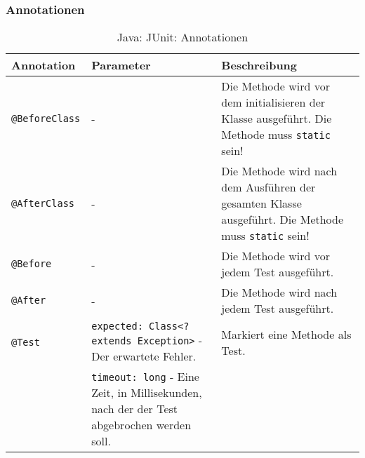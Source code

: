 		\subsubsection{Annotationen}
			\begin{sidewaystable}
				\centering
				\begin{tabular}{l | p{9cm} | p{10cm}}
					Annotation            & Parameter                                                                                        & Beschreibung                                                                                               \\
					\hline
					\texttt{@BeforeClass} & -                                                                                                & Die Methode wird vor dem initialisieren der Klasse ausgeführt. Die Methode muss \texttt{static} sein!      \\
					\texttt{@AfterClass}  & -                                                                                                & Die Methode wird nach dem Ausführen der gesamten Klasse ausgeführt. Die Methode muss \texttt{static} sein! \\
					\texttt{@Before}      & -                                                                                                & Die Methode wird vor jedem Test ausgeführt.                                                                \\
					\texttt{@After}       & -                                                                                                & Die Methode wird nach jedem Test ausgeführt.                                                               \\
					\texttt{@Test}        & \texttt{expected: Class<? extends Exception>} - Der erwartete Fehler.                            & Markiert eine Methode als Test.                                                                            \\
					                      & \texttt{timeout: long} - Eine Zeit, in Millisekunden, nach der der Test abgebrochen werden soll. &                                                                                                            \\
				\end{tabular}
				\caption{Java: JUnit: Annotationen}
			\end{sidewaystable}


